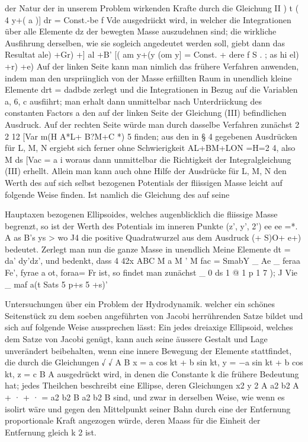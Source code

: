 \documentclass[11pt]{article}
\begin{document}
der Natur der in unserem Problem wirkenden Krafte durch die Gleichung II ) t ( 4 y+( a
)] dr = Const.-be f Vde ausgedriickt wird, in welcher die Integrationen über alle Elemente
dz der bewegten Masse auszudehnen sind; die wirkliche Ausfihrung derselben, wie sie
sogleich angedeutet werden soll, giebt dann das Resultat ale) +Gr) +] al +B’ [( am y+(y
(om y] = Const. + dere f S . ; as hi el) +r) +e) Auf der linken Seite kann man nimlich
das frühere Verfahren anwenden, indem man den urspriinglich von der Masse erfiillten
Raum in unendlich kleine Elemente drt = dadbde zerlegt und die Integrationen in Bezug
auf die Variablen a, 6, c ausfiihrt; man erhalt dann unmittelbar nach Unterdriickung des constanten Factors a den auf der linken Seite der Gleichung (III) befindlichen Ausdruck.
Auf der rechten Seite würde man durch dasselbe Verfahren zunächst 2 2 12 [Var m(H
A*L+ B?M+C *) 5 finden; aus den in § 4 gegebenen Ausdrücken für L, M, N ergiebt sich
ferner ohne Schwierigkeit AL+BM+LON =H=2 4, also M ds [Vac = a i woraus dann
unmittelbar die Richtigkeit der Integralgleichung (III) erhellt. Allein man kann auch ohne
Hilfe der Ausdrücke für L, M, N den Werth des auf sich selbst bezogenen Potentials der
fliissigen Masse leicht auf folgende Weise finden. Ist namlich die Gleichung des auf seine

Hauptaxen bezogenen Ellipsoides, welches augenblicklich die fliissige Masse begrenzt, so
ist der Werth des Potentials im inneren Punkte (z’, y’, 2’) ee ee =*. A as B’s ys > wo J4
die positive Quadratwurzel aus dem Ausdruck (+ S)O+ e+) bedeutet. Zerlegt man nun
die ganze Masse in unendlich Meine Elemente dt = da’ dy’dz’, und bedenkt, dass 4 42x
ABC M a M ’ M fac = SmabY \_ Ae \_ feraa Fe’, fyrae a ot, foraa= Fr ist, so findet man
zunächst \_ 0 ds 1 @ 1 p 1 7 ); J Vie \_ maf a(t Sats 5 p+s 5 +s)’

Untersuchungen über ein Problem der Hydrodynamik.
welcher ein schönes Seitenstück zu dem soeben angeführten von Jacobi herrührenden
Satze bildet und sich auf folgende Weise aussprechen lässt:
Ein jedes dreiaxige Ellipsoid, welches dem Satze von Jacobi genügt, kann auch seine äussere Gestalt und Lage unverändert beibehalten, wenn eine innere Bewegung der
Elemente stattfindet, die durch die Gleichungen
√
√
A
B
x = a cos kt + b
sin kt, y = −a
sin kt + b cos kt, z = c
B
A
ausgedrückt wird, in denen die Constante k die frühere Bedeutung hat; jedes Theilchen
beschreibt eine Ellipse, deren Gleichungen
x2 y 2 A
a2 b2 A
+
·
+ ·
=
a2
b2 B
a2 b2 B
sind, und zwar in derselben Weise, wie wenn es isolirt wäre und gegen den Mittelpunkt
seiner Bahn durch eine der Entfernung proportionale Kraft angezogen würde, deren Maass
für die Einheit der Entfernung gleich k 2 ist.
\end{document}
